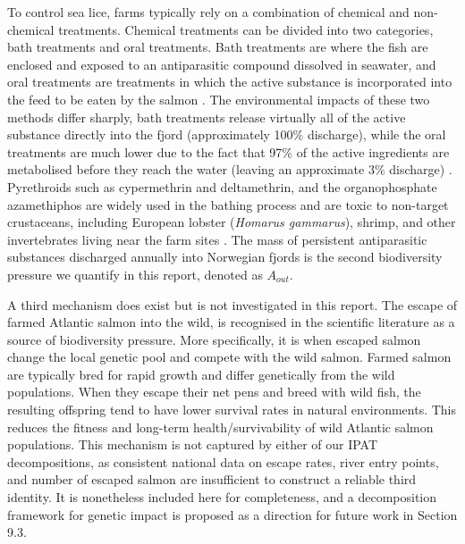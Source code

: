 \documentclass[12pt, a4paper]{report}
\begin{document}
To control sea lice, farms typically rely on a combination of chemical and non-chemical treatments. Chemical treatments can be divided into two categories, bath treatments and oral treatments. Bath treatments are where the fish are enclosed and exposed to an antiparasitic compound dissolved in seawater, and oral treatments are treatments in which the active substance is incorporated into the feed to be eaten by the salmon \citep{myhrjensen2020}. The environmental impacts of these two methods differ sharply, bath treatments release virtually all of the active substance directly into the fjord (approximately 100\% discharge), while the oral treatments are much lower due to the fact that 97\% of the active ingredients are metabolised before they reach the water (leaving an approximate 3\% discharge) \citep{myhrjensen2020}. Pyrethroids such as cypermethrin and deltamethrin, and the organophosphate azamethiphos are widely used in the bathing process and are toxic to non-target crustaceans, including European lobster (\textit{Homarus gammarus}), shrimp, and other invertebrates living near the farm sites \citep{samuelsen2020}. The mass of persistent antiparasitic substances discharged annually into Norwegian fjords is the second biodiversity pressure we quantify in this report, denoted as \(A_{out}\).

A third mechanism does exist but is not investigated in this report. The escape of farmed Atlantic salmon into the wild, is recognised in the scientific literature as a source of biodiversity pressure. More specifically, it is when escaped salmon change the local genetic pool and compete with the wild salmon. Farmed salmon are typically bred for rapid growth and differ genetically from the wild populations. When they escape their net pens and breed with wild fish, the resulting offspring tend to have lower survival rates in natural environments. This reduces the fitness and long-term health/survivability of wild Atlantic salmon populations. This mechanism is not captured by either of our IPAT decompositions, as consistent national data on escape rates, river entry points, and number of escaped salmon are insufficient to construct a reliable third identity. It is nonetheless included here for completeness, and a decomposition framework for genetic impact is proposed as a direction for future work in Section 9.3.
\end{document}
